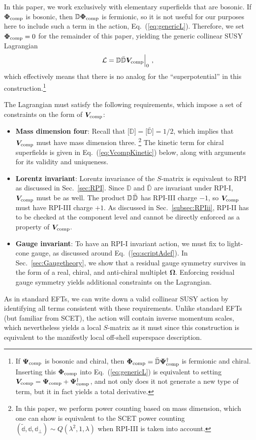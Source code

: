 \documentclass[12pt,document,nofootinbib,superscriptaddress,onecolumn,preprintnumbers,balancelastpage]{article}
\newcommand{\s}{\hspace{0.8pt}}
\newcommand{\PP}{\mathbb{d}}
\DeclareRobustCommand{\Sec}[1]{Sec.~\ref{#1}}
\DeclareRobustCommand{\Eq}[1]{Eq.~(\ref{#1})}
\newcommand{\D}{\mathbb{D}}
\newcommand{\Dbar}{\bar{\mathbb{D}}}
\newcommand{\RCA}{\boldsymbol{\Omega}}
\newcommand{\bPhi}{\boldsymbol{\Phi}}
\newcommand{\bPsi}{\boldsymbol{\Psi}}
\newcommand{\bV}{\boldsymbol{V}}
\begin{document}
\begin{spacing}{1.2}
In this paper, we work exclusively with elementary superfields that are bosonic.
%
If $\bPhi_{\rm comp}$ is bosonic, then $\D \bPhi_{\rm comp}$ is fermionic, so it is not useful for our purposes here to include such a term in the action, \Eq{eq:genericL}. 
%
Therefore, we set $\bPhi_{\rm comp} = 0$ for the remainder of this paper, yielding the generic collinear SUSY Lagrangian
%
\begin{align}
\label{eq:VrestrictedL}
\mathcal{L} =  \D \bar{\D} \bV_{\rm comp} \Big|_{0}\,\,,
\end{align}
%
which effectively means that there is no analog for the ``superpotential'' in this construction.\footnote{If $\bPsi_{\rm comp}$ is bosonic and chiral, then $\bPhi_{\rm comp} = \Dbar \bPsi^\dagger_{\rm comp}$ is fermionic and chiral.  Inserting this $\bPhi_{\rm comp}$ into \Eq{eq:genericL} is equivalent to setting $\bV_{\rm comp} = \bPsi_{\rm comp} + \bPsi_{\rm comp}^\dagger$, and not only does it not generate a new type of term, but it in fact yields a total derivative.}

The Lagrangian must satisfy the following requirements, which impose a set of constraints on the form of $\bV_{\rm comp}$:
%
\begin{itemize}
\item \textbf{Mass dimension four}:
%
Recall that $\big[\D\big] = \big[\bar{\D}\big] = 1/2$, which implies that $\bV_{\rm comp}$ must have mass dimension three.%
%
\footnote{In this paper, we perform power counting based on mass dimension, which one can show is equivalent to the SCET power counting $(\tilde{\PP}, \PP, \PP_\perp) \sim Q (\lambda^2, 1, \lambda)$ when RPI-III is taken into account.}
%
%
The kinetic term for chiral superfields is given in \Eq{eq:VcompKinetic} below, along with arguments for its validity and uniqueness.
%
\item \textbf{Lorentz invariant}:
%
Lorentz invariance of the $S$-matrix is equivalent to RPI as discussed in \Sec{sec:RPI}.
%
Since $\D$ and $\Dbar$ are invariant under RPI-I, $\bV_{\rm comp}$ must be as well.
%
The product $\D \s\Dbar$ has RPI-III charge $-1$, so $\bV_{\rm comp}$ must have RPI-III charge $+1$.
%
%
As discussed in \Sec{subsec:RPIii}, RPI-II has to be checked at the component level and cannot be directly enforced as a property of $\bV_{\rm comp}$.
%
\item \textbf{Gauge invariant}:
%
To have an RPI-I invariant action, we must fix to light-cone gauge, as discussed around \Eq{eq:scriptAdef}.
%
In \Sec{sec:Gaugetheory}, we show that a residual gauge symmetry survives in the form of a real, chiral, and anti-chiral multiplet $\RCA$.  Enforcing residual gauge symmetry yields additional constraints on the Lagrangian.
%
\end{itemize}
%
As in standard EFTs, we can write down a valid collinear SUSY action by identifying all terms consistent with these requirements.
%
Unlike standard EFTs (but familiar from SCET), the action will contain inverse momentum scales, which nevertheless yields a local $S$-matrix as it must since this construction is equivalent to the manifestly local off-shell superspace description.


\end{spacing}
\end{document}
